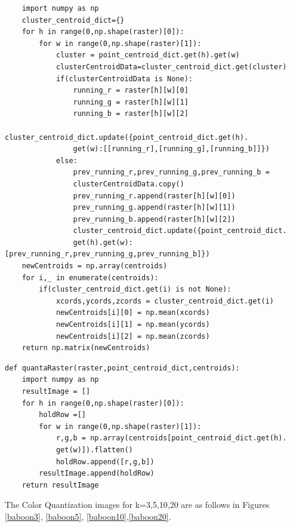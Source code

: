 \documentclass[12pt]{article}
\newenvironment{QandA}
{
	\begin{enumerate}[label=\normalfont\arabic*.,leftmargin=2em,rightmargin=2em]\normalfont
	}
	{
	\end{enumerate}
}
\newenvironment{answered}{\setlength{\parindent}{1em}\par\normalfont}{}
\begin{document}
\begin{QandA}
{\begin{enumerate}
{\begin{answered}
\begin{verbatim}
    import numpy as np
    cluster_centroid_dict={}
    for h in range(0,np.shape(raster)[0]):
        for w in range(0,np.shape(raster)[1]):
            cluster = point_centroid_dict.get(h).get(w)
            clusterCentroidData=cluster_centroid_dict.get(cluster)
            if(clusterCentroidData is None):
                running_r = raster[h][w][0]
                running_g = raster[h][w][1]
                running_b = raster[h][w][2]
                cluster_centroid_dict.update({point_centroid_dict.get(h).
                get(w):[[running_r],[running_g],[running_b]]})
            else:
                prev_running_r,prev_running_g,prev_running_b = 
                clusterCentroidData.copy()
                prev_running_r.append(raster[h][w][0])
                prev_running_g.append(raster[h][w][1])
                prev_running_b.append(raster[h][w][2])
                cluster_centroid_dict.update({point_centroid_dict.
                get(h).get(w):[prev_running_r,prev_running_g,prev_running_b]})
    newCentroids = np.array(centroids)
    for i,_ in enumerate(centroids):
        if(cluster_centroid_dict.get(i) is not None):
            xcords,ycords,zcords = cluster_centroid_dict.get(i)
            newCentroids[i][0] = np.mean(xcords)
            newCentroids[i][1] = np.mean(ycords)
            newCentroids[i][2] = np.mean(zcords)
    return np.matrix(newCentroids)
\end{verbatim}
\begin{verbatim}
def quantaRaster(raster,point_centroid_dict,centroids):
    import numpy as np
    resultImage = []
    for h in range(0,np.shape(raster)[0]):
        holdRow =[]
        for w in range(0,np.shape(raster)[1]):
            r,g,b = np.array(centroids[point_centroid_dict.get(h).
            get(w)]).flatten()
            holdRow.append([r,g,b])
        resultImage.append(holdRow)
    return resultImage
\end{verbatim}
The Color Quantization images for k=3,5,10,20 are as follows in Figures \ref{baboon3}, \ref{baboon5}, \ref{baboon10},\ref{baboon20}.
		 \begin{figure}
		\centering

\end{figure}
\end{answered}}
\end{enumerate}}
\end{QandA}
\end{document}
